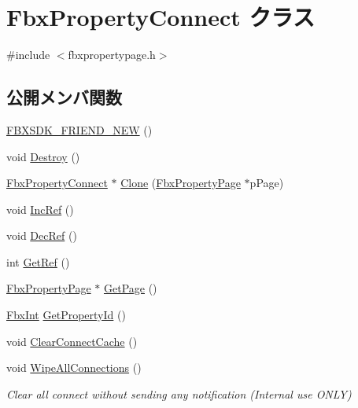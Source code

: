 \hypertarget{class_fbx_property_connect}{}\section{Fbx\+Property\+Connect クラス}
\label{class_fbx_property_connect}


{\ttfamily \#include $<$fbxpropertypage.\+h$>$}

\subsection*{公開メンバ関数}
\begin{DoxyCompactItemize}
\item 
\hyperlink{class_fbx_property_connect_ac857234b07a63fba9f3433a02c9217c7}{F\+B\+X\+S\+D\+K\+\_\+\+F\+R\+I\+E\+N\+D\+\_\+\+N\+EW} ()
\item 
void \hyperlink{class_fbx_property_connect_aed862bff6fa1cfb39b7f76cd52d4b8a1}{Destroy} ()
\item 
\hyperlink{class_fbx_property_connect}{Fbx\+Property\+Connect} $\ast$ \hyperlink{class_fbx_property_connect_aff713a2a67f9a1cfb0ecad7e548304ea}{Clone} (\hyperlink{class_fbx_property_page}{Fbx\+Property\+Page} $\ast$p\+Page)
\item 
void \hyperlink{class_fbx_property_connect_ad1c6573c7343eab1e833824f02be39e1}{Inc\+Ref} ()
\item 
void \hyperlink{class_fbx_property_connect_a2396c6fe707bc6f2f44cc70fdbe44761}{Dec\+Ref} ()
\item 
int \hyperlink{class_fbx_property_connect_a085658a0559ff68f4eb555f0d981e038}{Get\+Ref} ()
\item 
\hyperlink{class_fbx_property_page}{Fbx\+Property\+Page} $\ast$ \hyperlink{class_fbx_property_connect_a738445f2445642878f28886d95e107e9}{Get\+Page} ()
\item 
\hyperlink{fbxtypes_8h_a088fa96de3b0b3ea69f0f6afef525dfb}{Fbx\+Int} \hyperlink{class_fbx_property_connect_af2dd9a64ff4fa806d330d7f21eeb9dbf}{Get\+Property\+Id} ()
\item 
void \hyperlink{class_fbx_property_connect_a993c2baae886bb7259a5246ef2e791f3}{Clear\+Connect\+Cache} ()
\item 
void \hyperlink{class_fbx_property_connect_a56ae82d708c6c05c82a8e98d565f986b}{Wipe\+All\+Connections} ()
\begin{DoxyCompactList}\small\item\em Clear all connect without sending any notification (Internal use O\+N\+LY) \end{DoxyCompactList}\item 

\end{DoxyCompactItemize}
